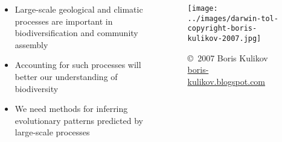 \begin{frame}
    \begin{columns}[c]
        
        \begin{itemize}
            \item<2-> Large-scale geological and climatic processes are
                important in biodiversification and community assembly
            \item<3-> Accounting for such processes will better our
                understanding of biodiversity
            \item<4-> We need methods for inferring evolutionary patterns
                predicted by large-scale processes
        \end{itemize}
        

        \begin{figure}
            \begin{center}
            \texttt{[image: ../images/darwin-tol-copyright-boris-kulikov-2007.jpg]}
            \caption{\tiny \copyright~2007 Boris Kulikov \href{http://boris-kulikov.blogspot.com/}{boris-kulikov.blogspot.com}}
            \end{center}
        \end{figure}
    \end{columns}
\end{frame}


